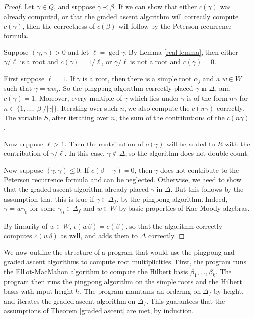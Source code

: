 \documentclass[12pt]{article}
\theoremstyle{definition}
\begin{document}
\begin{proof}
    Let $\gamma \in Q$, and suppose $\gamma \prec \beta$. If we can show that either $c(\gamma)$ was already computed, or that the graded ascent algorithm will correctly compute $c(\gamma)$, then the correctness of $c(\beta)$ will follow by the Peterson recurrence formula.
    
    Suppose $(\gamma, \gamma) > 0$ and let $\ell = \gcd \gamma$. By Lemma \ref{real lemma}, then either $\gamma/\ell$ is a root and $c(\gamma) = 1/\ell$, or $\gamma/\ell$ is not a root and $c(\gamma) = 0$.
    
    First suppose $\ell = 1$. If $\gamma$ is a root, then there is a simple root $\alpha_j$ and a $w \in W$ such that $\gamma = w\alpha_j$. So the pingpong algorithm correctly placed $\gamma$ in $\Delta$, and $c(\gamma) = 1$. Moreover, every multiple of $\gamma$ which lies under $\gamma$ is of the form $n\gamma$ for $n \in \{1, \dots, |\beta|/|\gamma|\}$. Iterating over such $n$, we also compute the $c(n\gamma)$ correctly. The variable $S$, after iterating over $n$, the sum of the contributions of the $c(n\gamma)$.
    
    Now suppose $\ell > 1$. Then the contribution of $c(\gamma)$ will be added to $R$ with the contribution of $\gamma/\ell$. In this case, $\gamma \notin \Delta$, so the algorithm does not double-count.
    
    Now suppose $(\gamma, \gamma) \leq 0$. If $c(\beta - \gamma) = 0$, then $\gamma$ does not contribute to the Peterson recurrence formula and can be neglected. Otherwise, we need to show that the graded ascent algorithm already placed $\gamma$ in $\Delta$. But this follows by the assumption that this is true if $\gamma \in \Delta_f$, by the pingpong algorithm. Indeed, $\gamma = w\gamma_0$ for some $\gamma_0 \in \Delta_f$ and $w \in W$ by basic properties of Kac-Moody algebras.
    
    By linearity of $w \in W$, $c(w\beta) = c(\beta)$, so that the algorithm correctly computes $c(w\beta)$ as well, and adds them to $\Delta$ correctly.
\end{proof}

We now outline the structure of a program that would use the pingpong and graded ascent algorithms to compute root multiplicities. First, the program runs the Elliot-MacMahon algorithm to compute the Hilbert basis $\beta_1, \dots, \beta_k$. The program then runs the pingpong algorithm on the simple roots and the Hilbert basis with input height $h$. The program maintains an ordering on $\Delta_f$ by height, and iterates the graded ascent algorithm on $\Delta_f$. This guarantees that the assumptions of Theorem \ref{graded ascent} are met, by induction.
\end{document}
